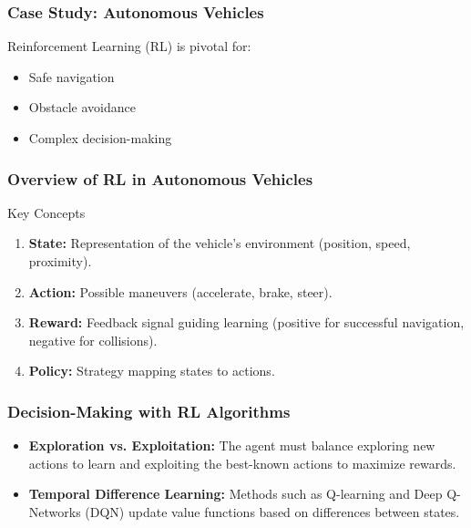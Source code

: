 \documentclass[aspectratio=169]{beamer}
\begin{document}
\begin{frame}
    \frametitle{Case Study: Autonomous Vehicles}
    Reinforcement Learning (RL) is pivotal for:
    \begin{itemize}
        \item Safe navigation
        \item Obstacle avoidance
        \item Complex decision-making
    \end{itemize}
\end{frame}

\begin{frame}
    \frametitle{Overview of RL in Autonomous Vehicles}
    \begin{block}{Key Concepts}
        \begin{enumerate}
            \item \textbf{State:} Representation of the vehicle's environment (position, speed, proximity).
            \item \textbf{Action:} Possible maneuvers (accelerate, brake, steer).
            \item \textbf{Reward:} Feedback signal guiding learning (positive for successful navigation, negative for collisions).
            \item \textbf{Policy:} Strategy mapping states to actions.
        \end{enumerate}
    \end{block}
\end{frame}

\begin{frame}
    \frametitle{Decision-Making with RL Algorithms}
    \begin{itemize}
        \item \textbf{Exploration vs. Exploitation:} 
        The agent must balance exploring new actions to learn and exploiting the best-known actions to maximize rewards.
        
        \item \textbf{Temporal Difference Learning:} 
        Methods such as Q-learning and Deep Q-Networks (DQN) update value functions based on differences between states.
    \end{itemize}
\end{frame}
\end{document}
